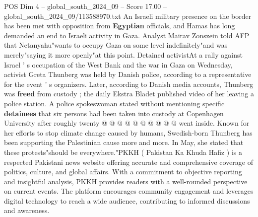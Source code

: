 \begin{textsample}{POS Dim 4 – global\_south\_2024\_09 – Score 17.00 – global\_south\_2024\_09/113588970.txt}
An Israeli military presence on the border has been met with opposition from \textbf{Egyptian} officials, and Hamas has long demanded an end to Israeli activity in Gaza.
Analyst Mairav Zonszein told AFP that Netanyahu"wants to occupy Gaza on some level indefinitely"and was merely"saying it more openly"at this point.
Detained activistAt a rally against Israel ' s occupation of the West Bank and the war in Gaza on Wednesday, activist Greta Thunberg was held by Danish police, according to a representative for the event ' s organizers.
Later, according to Danish media accounts, Thunberg was \textbf{freed} from custody ; the daily Ekstra Bladet published video of her leaving a police station.
A police spokeswoman stated without mentioning specific \textbf{detainees} that six persons had been taken into custody at Copenhagen University after roughly twenty @ @ @ @ @ @ @ @ @ @ went inside.
Known for her efforts to stop climate change caused by humans, Swedish-born Thunberg has been supporting the Palestinian cause more and more.
In May, she stated that these protests"should be everywhere."PKKH ( Pakistan Ka Khuda Hafiz ) is a respected Pakistani news website offering accurate and comprehensive coverage of politics, culture, and global affairs.
With a commitment to objective reporting and insightful analysis, PKKH provides readers with a well-rounded perspective on current events.
The platform encourages community engagement and leverages digital technology to reach a wide audience, contributing to informed discussions and awareness.

\end{textsample}
